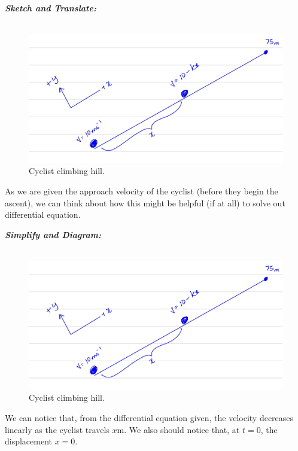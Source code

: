 \begin{subquestions}
\begin{subsubquestions}
	
\subsubquestion

\textbf{\textit{Sketch and Translate:}} \\ \\
\begin{figure}[H]
	\begin{center}
		\includegraphics[scale=0.25]{../2013/figures/2013q5-3}
		\caption{\label{2013:q5:Sketch3} Cyclist climbing hill.}
	\end{center}
\end{figure}
As we are given the approach velocity of the cyclist (before they begin the ascent), we can think about how this might be helpful (if at all) to solve out differential equation.
	
	
	
	
\textbf{\textit{Simplify and Diagram:}} \\ \\
\begin{figure}[H]
	\begin{center}
		\includegraphics[scale=0.25]{../2013/figures/2013q5-3}
		\caption{\label{2013:q5:Diagram3} Cyclist climbing hill.}
	\end{center}
\end{figure}
We can notice that, from the differential equation given, the velocity decreases linearly as the cyclist travels $x$m. We also should notice that, at $t=0$, the displacement $x=0$.





\end{subsubquestions}
\end{subquestions}
